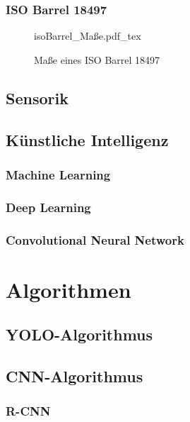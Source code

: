 \documentclass[12pt,
titlepage,
a4paper,
oneside,     %
openany,     %
listof=totoc,  %
numbers = noenddot, %
bibliography=totoc,    %
headsepline, %
]{scrbook} %
\begin{document}
\subsection{ISO Barrel 18497}
\label{subsec_iso}

\begin{figure}[h]
	\centering
	\def\svgwidth{0.6\columnwidth}
	{isoBarrel_Maße.pdf_tex}
	\caption{Maße eines ISO Barrel 18497}
	\label{fig:isoBarrel}
\end{figure}

\section{Sensorik}
\label{sec_sensorik}

\section{Künstliche Intelligenz}
\label{sec_ki}

\subsection{Machine Learning}
\label{subsec_machine}

\subsection{Deep Learning}
\label{subsec_deep}

\subsection{Convolutional Neural Network}
\label{subsec_convnn}


\chapter{Algorithmen}
\label{cha:algorithmen}

\section{YOLO-Algorithmus}
\label{sec_yolo}

\section{CNN-Algorithmus}
\label{sec_cnn}

\subsection{R-CNN}
\label{subsec_rcnn}
\end{document}
